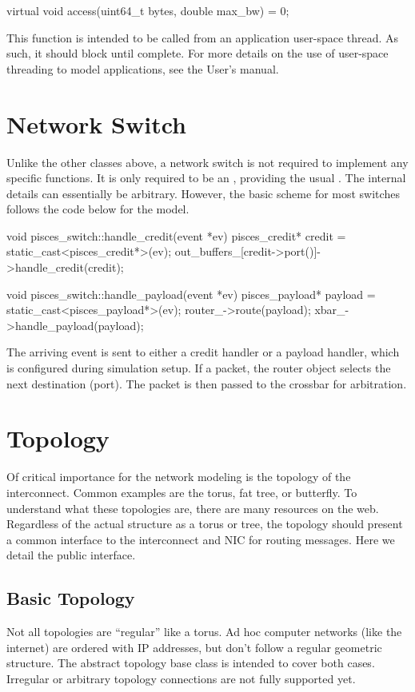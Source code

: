 \begin{CppCode}
virtual void access(uint64_t bytes, double max_bw) = 0;
\end{CppCode}

This function is intended to be called from an application user-space thread.
As such, it should block until complete.
For more details on the use of user-space threading to model applications,
see the User's manual.


\section{Network Switch}\label{sec:networkSwitch}

Unlike the other classes above, a network switch is not required to implement any specific functions.
It is only required to be an , providing the usual .
The internal details can essentially be arbitrary.
However, the basic scheme for most switches follows the code below for the  model.

\begin{CppCode}
void pisces_switch::handle_credit(event *ev)
{
  pisces_credit* credit = static_cast<pisces_credit*>(ev);
  out_buffers_[credit->port()]->handle_credit(credit);
}

void pisces_switch::handle_payload(event *ev)
{
  pisces_payload* payload = static_cast<pisces_payload*>(ev);
  router_->route(payload);
  xbar_->handle_payload(payload);
}
\end{CppCode}
The arriving event is sent to either a credit handler or a payload handler,
which is configured during simulation setup.
If a packet, the router object selects the next destination (port).
The packet is then passed to the crossbar for arbitration.

\section{Topology}
\label{sec:topology}
Of critical importance for the network modeling is the topology of the interconnect.
Common examples are the torus, fat tree, or butterfly.
To understand what these topologies are, there are many resources on the web.
Regardless of the actual structure as a torus or tree, the topology should present a common interface to the interconnect and NIC for routing messages.
Here we detail the public interface.

\subsection{Basic Topology}
\label{subsec:basicTopology}
Not all topologies are ``regular'' like a torus.  Ad hoc computer networks (like the internet) are ordered with IP addresses, but don't follow a regular geometric structure.
The abstract topology base class is intended to cover both cases.
Irregular or arbitrary topology connections are not fully supported yet.

